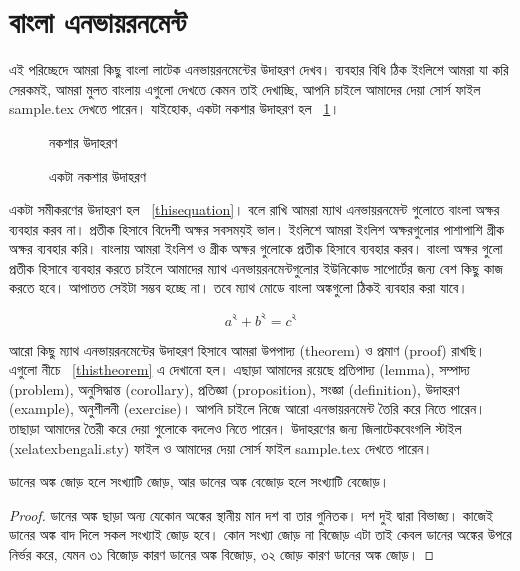 \section{বাংলা এনভায়রনমেন্ট}

এই পরিচ্ছেদে আমরা কিছু বাংলা লাটেক এনভায়রনমেন্টের উদাহরণ দেখব। ব্যবহার বিধি ঠিক ইংলিশে আমরা যা করি সেরকমই, আমরা মুলত বাংলায় এগুলো দেখতে কেমন তাই দেখাচ্ছি, আপনি চাইলে আমাদের দেয়া সোর্স ফাইল sample.tex দেখতে পারেন। যাইহোক, একটা নকশার উদাহরণ হল \figurename ~\ref{thisfigure}। 

\begin{figure}[!tbh]
	\begin{center}
	{\bnem\Huge নকশার উদাহরণ}
	\end{center}
	\caption{একটা নকশার উদাহরণ}
	\label{thisfigure}
\end{figure}

একটা সমীকরণের উদাহরণ হল \equationname ~\ref{thisequation}। বলে রাখি আমরা ম্যাথ এনভায়রনমেন্ট গুলোতে বাংলা অক্ষর ব্যবহার করব না। প্রতীক হিসাবে বিদেশী অক্ষর সবসময়ই ভাল। ইংলিশে আমরা ইংলিশ অক্ষরগুলোর পাশাপাশি গ্রীক অক্ষর ব্যবহার করি। বাংলায় আমরা ইংলিশ ও গ্রীক অক্ষর গুলোকে প্রতীক হিসাবে ব্যবহার করব। বাংলা অক্ষর গুলো প্রতীক হিসাবে ব্যবহার করতে চাইলে আমাদের ম্যাথ এনভায়রনমেন্টগুলোর ইউনিকোড সাপোর্টের জন্য বেশ কিছু কাজ করতে হবে। আপাতত সেইটা সম্ভব হচ্ছে না। তবে ম্যাথ মোডে বাংলা অঙ্কগুলো ঠিকই ব্যবহার করা যাবে।

\begin{equation} \label{thisequation}
	a^২ + b^২ = c^২
\end{equation}

আরো কিছু ম্যাথ এনভায়রনমেন্টের উদাহরণ হিসাবে আমরা উপপাদ্য (theorem) ও প্রমাণ (proof) রাখছি। এগুলো নীচে \theoremname ~\ref{thistheorem} এ দেখানো হল। এছাড়া আমাদের রয়েছে প্রতিপাদ্য (lemma), সম্পাদ্য (problem), অনুসিদ্ধান্ত (corollary), প্রতিজ্ঞা (proposition), সংজ্ঞা (definition), উদাহরণ (example), অনুশীলনী (exercise)। আপনি চাইলে নিজে আরো এনভায়রনমেন্ট তৈরি করে নিতে পারেন। তাছাড়া আমাদের তৈরী করে দেয়া গুলোকে বদলেও নিতে পারেন। উদাহরণের জন্য জিলাটেকবেংগলি স্টাইল (xelatexbengali.sty) ফাইল ও আমাদের দেয়া সোর্স ফাইল sample.tex দেখতে পারেন।

\begin{theorem}\label{thistheorem}
ডানের অঙ্ক জোড় হলে সংখ্যাটি জোড়, আর ডানের অঙ্ক বেজোড় হলে সংখ্যাটি বেজোড়।
\end{theorem}

\begin{proof}
ডানের অঙ্ক ছাড়া অন্য যেকোন অঙ্কের স্থানীয় মান দশ বা তার গুনিতক। দশ দুই দ্বারা বিভাজ্য। কাজেই ডানের অঙ্ক বাদ দিলে সকল সংখ্যাই জোড় হবে। কোন সংখ্যা জোড় না বিজোড় এটা তাই কেবল ডানের অঙ্কের উপরে নির্ভর করে, যেমন ৩১ বিজোড় কারণ ডানের অঙ্ক বিজোড়, ৩২ জোড় কারণ ডানের অঙ্ক জোড়। 
\end{proof}

